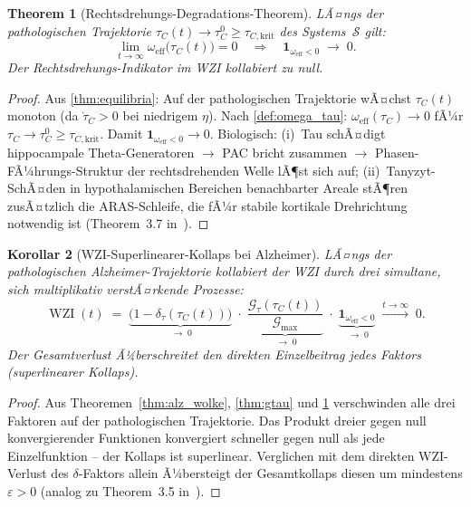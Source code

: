 ﻿\documentclass[12pt,a4paper]{article}
\newtheorem{theorem}{Theorem}[section]
\newtheorem{corollary}[theorem]{Korollar}
\theoremstyle{definition}
\DeclareMathOperator{\WZI}{WZI}
\begin{document}
	\begin{theorem}[Rechtsdrehungs-Degradations-Theorem]
		\label{thm:rotation_tau}
		LÃ¤ngs der pathologischen Trajektorie $\tau_C(t) \to \tau_C^0 \geq \tau_{C,\mathrm{krit}}$
		des Systems~$\mathcal{S}$ gilt:
		\[
			\lim_{t \to \infty} \omega_{\mathrm{eff}}\bigl(\tau_C(t)\bigr) = 0
			\quad\Rightarrow\quad
			\mathbf{1}_{\omega_{\mathrm{eff}} < 0} \;\to\; 0.
		\]
		Der Rechtsdrehungs-Indikator im WZI kollabiert zu null.
	\end{theorem}

	\begin{proof}
		Aus \cref{thm:equilibria}: Auf der pathologischen Trajektorie wÃ¤chst
		$\tau_C(t)$ monoton (da $\dot{\tau}_C > 0$ bei niedrigem $\eta$). Nach
		\cref{def:omega_tau}: $\omega_{\mathrm{eff}}(\tau_C) \to 0$ fÃ¼r
		$\tau_C \to \tau_C^0 \geq \tau_{C,\mathrm{krit}}$. Damit
		$\mathbf{1}_{\omega_{\mathrm{eff}} < 0} \to 0$.
		Biologisch: (i)~Tau schÃ¤digt hippocampale Theta-Generatoren $\to$ PAC bricht zusammen
		$\to$ Phasen-FÃ¼hrungs-Struktur der rechtsdrehenden Welle lÃ¶st sich auf;
		(ii)~Tanyzyt-SchÃ¤den in hypothalamischen Bereichen benachbarter Areale stÃ¶ren
		zusÃ¤tzlich die ARAS-Schleife, die fÃ¼r stabile kortikale Drehrichtung notwendig ist
		(Theorem~3.7 in~\cite{Epp2026brn}).
	\end{proof}

	\begin{corollary}[WZI-Superlinearer-Kollaps bei Alzheimer]
		\label{cor:wzi_collapse}
		LÃ¤ngs der pathologischen Alzheimer-Trajektorie kollabiert der WZI
		durch drei simultane, sich multiplikativ verstÃ¤rkende Prozesse:
		\[
			\WZI(t) \;=\;
			\underbrace{\bigl(1 - \delta_\tau(\tau_C(t))\bigr)}_{\;\to\; 0}
			\;\cdot\;
			\underbrace{\dfrac{\mathcal{G}_\tau(\tau_C(t))}{\mathcal{G}_{\max}}}_{\;\to\; 0}
			\;\cdot\;
			\underbrace{\mathbf{1}_{\omega_{\mathrm{eff}} < 0}}_{\;\to\; 0}
			\;\xrightarrow{t\to\infty}\; 0.
		\]
		Der Gesamtverlust Ã¼berschreitet den direkten Einzelbeitrag jedes Faktors
		(superlinearer Kollaps).
	\end{corollary}

	\begin{proof}
		Aus Theoremen~\ref{thm:alz_wolke}, \ref{thm:gtau} und \ref{thm:rotation_tau}
		verschwinden alle drei Faktoren auf der pathologischen Trajektorie.
		Das Produkt dreier gegen null konvergierender Funktionen konvergiert schneller
		gegen null als jede Einzelfunktion -- der Kollaps ist superlinear. Verglichen mit
		dem direkten WZI-Verlust des $\delta$-Faktors allein Ã¼bersteigt der Gesamtkollaps
		diesen um mindestens $\varepsilon > 0$ (analog zu Theorem~3.5 in~\cite{Epp2026brn}).
		
	\end{proof}
\end{document}
